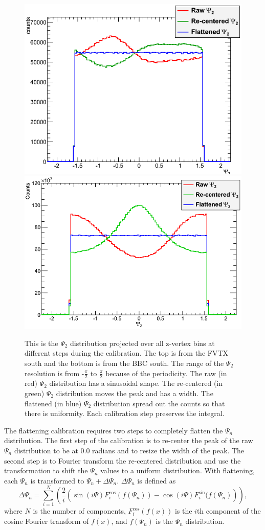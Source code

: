 \begin{figure}[!h]
\begin{center}
\includegraphics[width=0.65\linewidth]{figs/flattened_example_fvtx.png}
\includegraphics[width=0.62\linewidth]{figs/flattened_example_bbc.png}
\caption{This is the $\Psi_2$ distribution projected over all z-vertex bins at different steps during the calibration. The top is from the FVTX south and the bottom is from the BBC south. The range of the $\Psi_2$ resolution is from -$\frac{\pi}{2}$ to $\frac{\pi}{2}$ because of the periodicity. 
The raw (in red) $\Psi_2$ distribution has a sinusoidal shape. The re-centered (in green) $\Psi_2$ distribution moves the peak and has a width. The flattened (in blue) 
$\Psi_2$ distribution spread out the counts so that there is uniformity. Each calibration step preserves the integral.}
\end{center}
\label{fig:calibrated_psi}
\end{figure}

The flattening calibration requires two steps to completely flatten the $\Psi_n$ distribution. The first step of the calibration is to re-center the peak of the raw $\Psi_n$ distribution to be at 
0.0 radians and to resize the width of the peak. The second step is to Fourier transform the re-centered distribution and use the transformation to shift the $\Psi_n$ values to a uniform distribution. With flattening, each $\Psi_n$ is transformed to $\Psi_n + \Delta\Psi_n$. $\Delta\Psi_n$ is defined as
\begin{equation}
\Delta\Psi_n = \sum^{N}_{i=1}\left(\frac{2}{i}\left(\sin(i \Psi)F^{\cos}_{i}(f(\Psi_n))-\cos(i \Psi)F^{\sin}_{i}(f(\Psi_n)\right)\right),
\label{eq:deltapsi}
\end{equation}
where $N$ is the number of components, $F^{\cos}_{i}(f(x))$ is the $i$th component of the cosine Fourier transform of $f(x)$, and $f(\Psi_n)$ is the $\Psi_n$ distribution.

